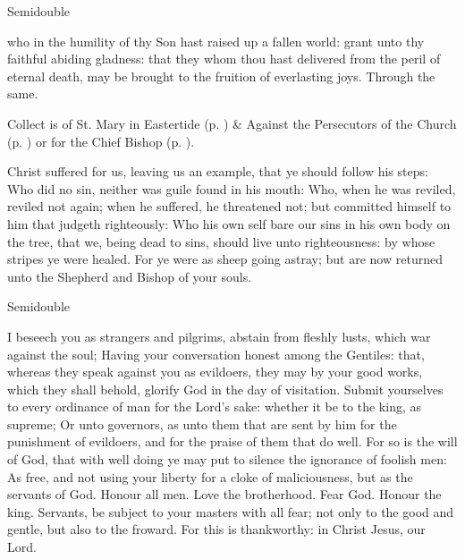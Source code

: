 \label{EasterII}
\begin{inhead}
    {Semidouble}
\end{inhead}

\collect
{} who in the humility of thy Son hast raised up a fallen world: grant unto thy faithful abiding gladness: that they whom thou hast delivered from the peril of eternal death, may be brought to the fruition of everlasting joys. Through the same.
\begin{rubric}
     Collect is of St. Mary in Eastertide (p. \pageref{SPMaryInEaster}) \&  Against the Persecutors of the Church (p. \pageref{SPAgainst}) or for the Chief Bishop (p. \pageref{SPChiefBishop}).
\end{rubric}


 Christ suffered for us, leaving us an example, that ye should follow his steps: Who did no sin, neither was guile found in his mouth: Who, when he was reviled, reviled not again; when he suffered, he threatened not; but committed himself to him that judgeth righteously: Who his own self bare our sins in his own body on the tree, that we, being dead to sins, should live unto righteousness: by whose stripes ye were healed. For ye were as sheep going astray; but are now returned unto the Shepherd and Bishop of your souls.


\begin{inhead}
    {Semidouble}
\end{inhead}

 I beseech you as strangers and pilgrims, abstain from fleshly lusts, which war against the soul; Having your conversation honest among the Gentiles: that, whereas they speak against you as evildoers, they may by your good works, which they shall behold, glorify God in the day of visitation. Submit yourselves to every ordinance of man for the Lord's sake: whether it be to the king, as supreme; Or unto governors, as unto them that are sent by him for the punishment of evildoers, and for the praise of them that do well. For so is the will of God, that with well doing ye may put to silence the ignorance of foolish men: As free, and not using your liberty for a cloke of maliciousness, but as the servants of God. Honour all men. Love the brotherhood. Fear God. Honour the king. Servants, be subject to your masters with all fear; not only to the good and gentle, but also to the froward. For this is thankworthy: in Christ Jesus, our Lord.

